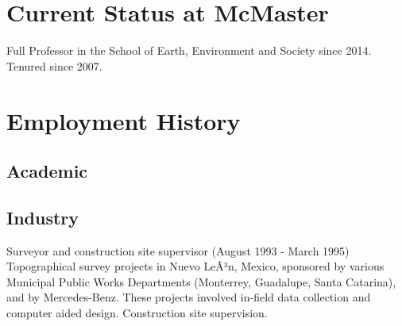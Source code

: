 \documentclass[10pt,a4paper,]{twentysecondcv}
\begin{document}
\hypertarget{current-status-at-mcmaster}{%
\section{Current Status at McMaster}\label{current-status-at-mcmaster}}

Full Professor in the School of Earth, Environment and Society since
2014. Tenured since 2007.

\hypertarget{employment-history}{%
\section{Employment History}\label{employment-history}}

\hypertarget{academic}{%
\subsection{Academic}\label{academic}}

\nopagebreak

\begin{twenty}
\end{twenty}

\hypertarget{industry}{%
\subsection{Industry}\label{industry}}

Surveyor and construction site supervisor (August 1993 - March 1995)
Topographical survey projects in Nuevo LeÃ³n, Mexico, sponsored by
various Municipal Public Works Departments (Monterrey, Guadalupe, Santa
Catarina), and by Mercedes-Benz. These projects involved in-field data
collection and computer aided design. Construction site supervision.
\end{document}
